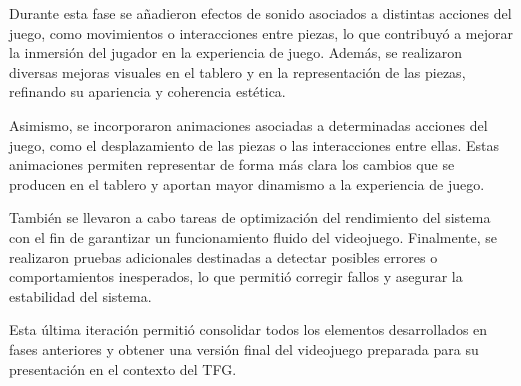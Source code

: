 Durante esta fase se añadieron efectos de sonido asociados a distintas acciones del juego, como movimientos o interacciones entre piezas, lo que contribuyó a mejorar la inmersión del jugador en la experiencia de juego. Además, se realizaron diversas mejoras visuales en el tablero y en la representación de las piezas, refinando su apariencia y coherencia estética.

Asimismo, se incorporaron animaciones asociadas a determinadas acciones del juego, como el desplazamiento de las piezas o las interacciones entre ellas. Estas animaciones permiten representar de forma más clara los cambios que se producen en el tablero y aportan mayor dinamismo a la experiencia de juego.

También se llevaron a cabo tareas de optimización del rendimiento del sistema con el fin de garantizar un funcionamiento fluido del videojuego. Finalmente, se realizaron pruebas adicionales destinadas a detectar posibles errores o comportamientos inesperados, lo que permitió corregir fallos y asegurar la estabilidad del sistema.

Esta última iteración permitió consolidar todos los elementos desarrollados en fases anteriores y obtener una versión final del videojuego preparada para su presentación en el contexto del TFG.